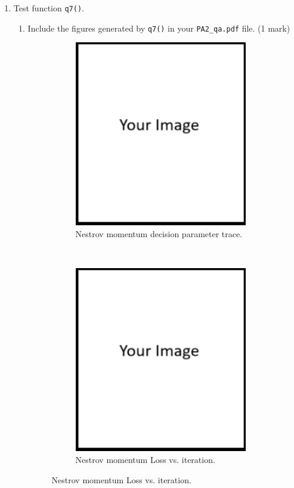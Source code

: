 \documentclass{article}
\theoremstyle{definition}
\begin{document}
\begin{enumerate}[label=\ref{mom}.\alph*]
\begin{enumerate}[label=1.2.b.\roman*]
\begin{figure}[h]
\begin{subfigure}[t]{0.5\textwidth}
				\caption{Heavy-ball momentum Loss vs. iteration.}
			\end{subfigure}
			\caption{Figures generated by q6().}
		\end{figure}
	\end{enumerate}
	\newpage
	\item Test function \verb|q7()|.
	\begin{enumerate}[label=1.2.c.\roman*]
		\item Include the figures generated by \verb|q7()| in your \verb|PA2_qa.pdf| file. (1 mark)
		\begin{figure}[h]
			\centering
			\begin{subfigure}[t]{0.5\textwidth}
				\centering
				\includegraphics[height=3.2in]{image.png}
				\caption{Nestrov momentum decision parameter trace.}
			\end{subfigure}%
			~ 
			\begin{subfigure}[t]{0.5\textwidth}
				\centering
				\includegraphics[height=3.2in]{image.png}
				\caption{Nestrov momentum Loss vs. iteration.}

\end{subfigure}
\end{figure}
\end{enumerate}
\end{enumerate}
\end{document}
